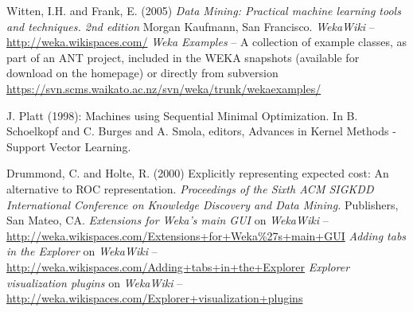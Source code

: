 %
%
%
%


\begin{thebibliography}{999}

		Witten, I.H. and Frank, E. (2005) \textit{Data Mining: Practical machine
		learning tools and techniques. 2nd edition}  Morgan Kaufmann, San
		Francisco.
		\textit{WekaWiki} -- \url{http://weka.wikispaces.com/}{}
		\textit{Weka Examples} -- A collection of example classes, as part of
an ANT project, included in the WEKA snapshots (available for download on the
homepage) or directly from subversion
\url{https://svn.scms.waikato.ac.nz/svn/weka/trunk/wekaexamples/}{}

		J. Platt (1998): Machines using Sequential Minimal Optimization. In B. Schoelkopf and C. Burges and A. Smola, editors, Advances in Kernel Methods - Support Vector Learning.

		Drummond, C. and Holte, R. (2000) Explicitly representing expected cost: An alternative to ROC representation.
		\textit{Proceedings of the Sixth ACM SIGKDD International Conference on Knowledge Discovery and Data Mining.}
		Publishers, San Mateo, CA.
		\textit{Extensions for Weka's main GUI} on \textit{WekaWiki} -- \\
		\small{\url{http://weka.wikispaces.com/Extensions+for+Weka\%27s+main+GUI}{}}
		\textit{Adding tabs in the Explorer} on \textit{WekaWiki} -- \\
		\small{\url{http://weka.wikispaces.com/Adding+tabs+in+the+Explorer}{}}
		\textit{Explorer visualization plugins} on \textit{WekaWiki} -- \\
		\small{\url{http://weka.wikispaces.com/Explorer+visualization+plugins}{}}


\end{thebibliography}
